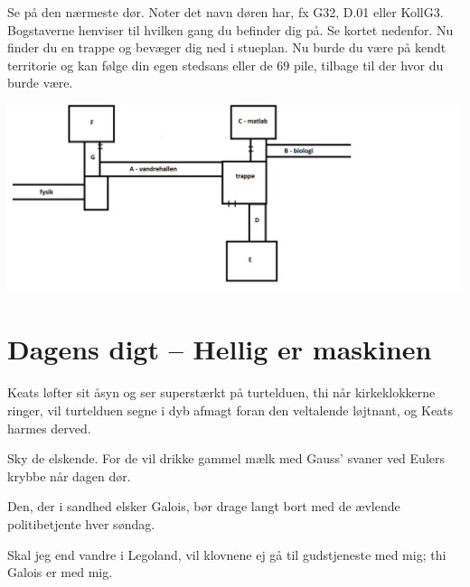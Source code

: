 \begin{minipage}[t]{170mm}
Se på den nærmeste dør. Noter det navn døren har, fx G32, D.01 eller KollG3. Bogstaverne henviser til hvilken gang du befinder dig på. Se kortet nedenfor. Nu finder du en trappe og bevæger dig ned i stueplan. Nu burde du være på kendt territorie og kan følge din egen stedsans eller de $69$ pile, tilbage til der hvor du burde være.
\begin{center}
\includegraphics[width=1.2\linewidth]{bogstav-kort.png}
\end{center}
\vspace{-3mm}
\section*{Dagens digt -- Hellig er maskinen}
\begin{center}
Keats løfter sit åsyn og ser superstærkt på turtelduen, thi når kirkeklokkerne ringer, vil turtelduen segne i dyb afmagt foran den veltalende løjtnant, og Keats harmes derved.

Sky de elskende. For de vil drikke gammel mælk med Gauss' svaner ved Eulers krybbe når dagen dør.

Den, der i sandhed elsker Galois, bør drage langt bort med de ævlende politibetjente hver søndag.

Skal jeg end vandre i Legoland, vil klovnene ej gå til gudstjeneste med mig; thi Galois er med mig.
\end{center}

\end{minipage}
